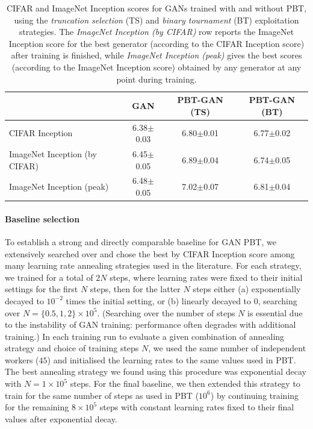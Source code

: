 \documentclass{article} %
\begin{document}
\begin{appendices}
\begin{table}
    \begin{center}
    \begin{tabular}{lccc}
    \toprule
                                  & \bf{GAN}           & \bf{PBT-GAN (TS)}  & \bf{PBT-GAN (BT)}  \\
    \midrule
    CIFAR Inception               & 6.38$\pm$0.03 & 6.80$\pm$0.01 & 6.77$\pm$0.02          \\
    ImageNet Inception (by CIFAR) & 6.45$\pm$0.05 & 6.89$\pm$0.04 & 6.74$\pm$0.05 \\
    ImageNet Inception (peak)     & 6.48$\pm$0.05 & 7.02$\pm$0.07 & 6.81$\pm$0.04 \\
    \bottomrule
    \end{tabular}
    \end{center}
    \caption{CIFAR and ImageNet Inception scores for GANs trained with and without PBT, using the \emph{truncation selection} (TS) and \emph{binary tournament} (BT) exploitation strategies.
    The \emph{ImageNet Inception (by CIFAR)} row reports the ImageNet Inception score for the best generator (according to the CIFAR Inception score) after training is finished, while \emph{ImageNet Inception (peak)} gives the best scores (according to the ImageNet Inception score) obtained by any generator at any point during training.}
    \label{tab:ganresults}
\end{table}

\paragraph{Baseline selection}
To establish a strong and directly comparable baseline for GAN PBT, we extensively searched over and chose the best by CIFAR Inception score among many learning rate annealing strategies used in the literature.
For each strategy, we trained for a total of $2N$ steps, where learning rates were fixed to their initial settings for the first $N$ steps, then for the latter $N$ steps either (a) exponentially decayed to $10^{-2}$ times the initial setting, or (b) linearly decayed to $0$,
searching over $N=\{0.5, 1, 2\}\times10^5$.
(Searching over the number of steps $N$ is essential due to the instability of GAN training: performance often degrades with additional training.)
In each training run to evaluate a given combination of annealing strategy and choice of training steps $N$,
we used the same number of independent workers ($45$) and initialised the learning rates to the same values used in PBT.
The best annealing strategy we found using this procedure was exponential decay with $N=1\times10^5$ steps.
For the final baseline, we then extended this strategy to train for the same number of steps as used in PBT ($10^6$) by continuing training for the remaining $8\times10^5$ steps with constant learning rates fixed to their final values after exponential decay.


\end{appendices}
\end{document}
